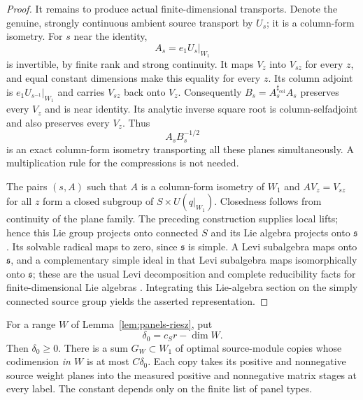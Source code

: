 \begin{proof}
It remains to produce actual finite-dimensional transports.  Denote the
genuine, strongly continuous ambient source transport by $U_s$; it is a
column-form isometry.  For $s$ near the identity,
\[
 A_s=e_1U_s|_{W_1}
\]
is invertible, by finite rank and strong continuity.  It maps $V_z$ into
$V_{sz}$ for every $z$, and equal constant dimensions make this equality
for every $z$.  Its column adjoint is
$e_1U_{s^{-1}}|_{W_1}$ and carries $V_{sz}$ back onto $V_z$.
Consequently $B_s=A_s^{\sharp_{\mathrm{col}}}A_s$ preserves every
$V_z$ and is near identity.  Its analytic inverse square root is
column-selfadjoint and also preserves every $V_z$.  Thus
\[
 A_s B_s^{-1/2}
\]
is an exact column-form isometry transporting all these planes
simultaneously.  A multiplication rule for the compressions is not
needed.

The pairs $(s,A)$ such that $A$ is a column-form isometry of $W_1$ and
$AV_z=V_{sz}$ for all $z$ form a closed subgroup of
$S\times U(q|_{W_1})$.  Closedness follows from continuity of the plane
family.  The preceding construction supplies local lifts; hence this
Lie group projects onto connected $S$ and its Lie algebra projects onto
$\mathfrak s$.  Its solvable radical maps to zero, since $\mathfrak s$
is simple.  A Levi subalgebra maps onto $\mathfrak s$, and a complementary
simple ideal in that Levi subalgebra maps isomorphically onto
$\mathfrak s$; these are the usual Levi decomposition and complete
reducibility facts for finite-dimensional Lie algebras
\cite[Appendix~B, Lemma~B.1 and Theorem~B.2]{Knapp2023}. Integrating this Lie-algebra section on the simply
connected source group yields the asserted representation.
\end{proof}

\begin{lemma}\label{lem:panels-defect}
For a range $W$ of Lemma~\ref{lem:panels-riesz}, put
\[
 \delta_0=c_Sr-\dim W.
\]
Then $\delta_0\geq0$.  There is a sum $G_W\subset W_1$ of optimal
source-module copies whose codimension \emph{in $W$} is at most
$C\delta_0$.  Each copy takes its positive and nonnegative source
weight planes into the measured positive and nonnegative matrix stages
at every label.  The constant depends only on the finite list of panel
types.
\end{lemma}

